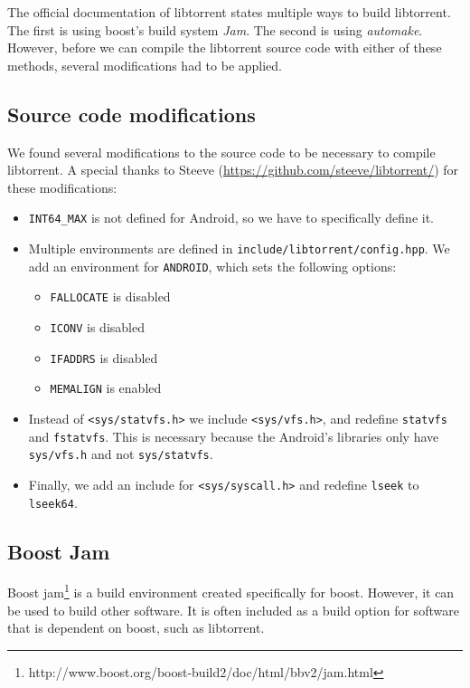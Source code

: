 		The official documentation of libtorrent states multiple ways to build libtorrent. The first is using boost's build system \emph{Jam}. The second is using \emph{automake}. However, before we can compile the libtorrent source code with either of these methods, several modifications had to be applied.
		
		\subsection{Source code modifications}
				
		We found several modifications to the source code to be necessary to compile libtorrent. A special thanks to Steeve (\url{https://github.com/steeve/libtorrent/}) for these modifications:
		
		\begin{itemize}
		\item \texttt{INT64\_MAX} is not defined for Android, so we have to specifically define it.
		\item Multiple environments are defined in \texttt{include/libtorrent/config.hpp}. We add an environment for \texttt{ANDROID}, which sets the following options:
			\begin{itemize}
				\item \texttt{FALLOCATE} is disabled
				\item \texttt{ICONV} is disabled
				\item \texttt{IFADDRS} is disabled
				\item \texttt{MEMALIGN} is enabled
			\end{itemize}
		\item Instead of \texttt{<sys/statvfs.h>} we include \texttt{<sys/vfs.h>}, and redefine \texttt{statvfs} and \texttt{fstatvfs}. This is necessary because the Android's libraries only have \texttt{sys/vfs.h} and not \texttt{sys/statvfs}.
		\item Finally, we add an include for \texttt{<sys/syscall.h>} and redefine \texttt{lseek} to \texttt{lseek64}.
		\end{itemize}
		
		\subsection{Boost Jam}
		Boost jam\footnote{http://www.boost.org/boost-build2/doc/html/bbv2/jam.html} is a build environment created specifically for boost. However, it can be used to build other software. It is often included as a build option for software that is dependent on boost, such as libtorrent.
		
